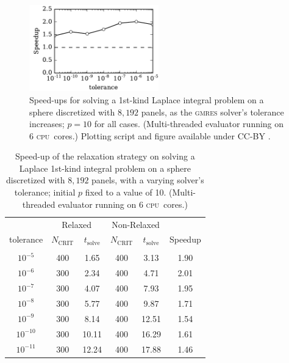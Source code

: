 \documentclass[final,3p,times]{elsarticle}
\newcommand{\cpu}{\textsc{cpu}}
\newcommand{\ncrit}{N_{\text{CRIT}}}
\newcommand{\tsolve}{t_{\text{solve}}}
\newcommand{\gmres}{\textsc{gmres}\xspace}
\begin{document}
\begin{figure}%
	\centering
	\includegraphics[natwidth=3in,natheight=2in,width=0.5\textwidth]{LaplaceSpeedupTolerance.pdf}
	\caption{Speed-ups for solving a 1st-kind Laplace integral problem on a sphere discretized with $8,192$ panels, as the \gmres solver's tolerance increases; $p=10$ for all cases. (Multi-threaded evaluator running on 6 \cpu\ cores.) Plotting script and figure available under CC-BY \cite{WangLaytonBarba2016-figshare2}.}
	\label{fig:laplace_tolerance_speedup}
\end{figure}


\begin{table}[h]
\footnotesize
\begin{center}
\begin{tabular}{c|cc|cc|c}
  & \multicolumn{2}{c|}{Relaxed} & \multicolumn{2}{c|}{Non-Relaxed} & \\
  tolerance & $\ncrit$ & $\tsolve$ & $\ncrit$ & $\tsolve$ & Speedup \\
 \hline
   & & & & & \\
  $10^{-5} $ & 400 & 1.65 & 400 & 3.13 & 1.90 \\
  $10^{-6} $ & 300 & 2.34 & 400 & 4.71 & 2.01 \\
  $10^{-7} $ & 300 & 4.07 & 400 & 7.93 & 1.95 \\
  $10^{-8} $ & 300 & 5.77 & 400 & 9.87 & 1.71 \\
  $10^{-9} $ & 300 & 8.14 & 400 & 12.51 & 1.54 \\
  $10^{-10} $ & 300 & 10.11 & 400 & 16.29 & 1.61 \\
  $10^{-11} $ & 300 & 12.24 & 400 & 17.88 & 1.46 \\
\end{tabular}
\end{center}
\caption{Speed-up of the relaxation strategy on solving a Laplace 1st-kind integral problem on a sphere discretized with $8,192$ panels, with a varying solver's tolerance; initial $p$ fixed to a value of 10. (Multi-threaded evaluator running on 6 \cpu\ cores.)}
\label{tab:laplace_1st_tolerance_relaxation}
\end{table}%
\end{document}
